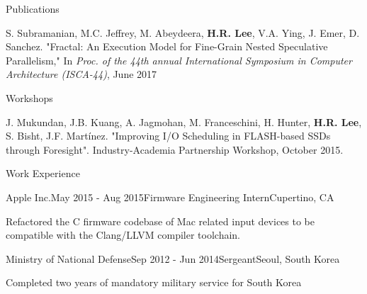 \documentclass{resume} %
\begin{document}

\begin{rSection}{Publications}

S. Subramanian, M.C. Jeffrey, M. Abeydeera, {\bf H.R. Lee}, V.A. Ying, J. Emer, D. Sanchez. 
"Fractal: An Execution Model for Fine-Grain Nested Speculative Parallelism,"
In \textit{Proc. of the 44th annual International Symposium in Computer Architecture (ISCA-44)}, June 2017

\end{rSection}


\begin{rSection}{Workshops}

J. Mukundan, J.B. Kuang, A. Jagmohan, M. Franceschini, H. Hunter, {\bf H.R. Lee}, S. Bisht, J.F. Martínez. "Improving I/O Scheduling in FLASH-based SSDs through Foresight". Industry-Academia Partnership Workshop, October 2015.

\end{rSection}


\begin{rSection}{Work Experience}

\begin{rSubsection}{Apple Inc.}{May 2015 - Aug 2015}{Firmware Engineering Intern}{Cupertino, CA}

\item Refactored the C firmware codebase of Mac related input devices to be compatible with the Clang/LLVM compiler toolchain. 
\end{rSubsection}

\begin{rSubsection}{Ministry of National Defense}{Sep 2012 - Jun 2014}{Sergeant}{Seoul, South Korea}

\item Completed two years of mandatory military service for South Korea
\end{rSubsection}

\end{rSection}
\end{document}
